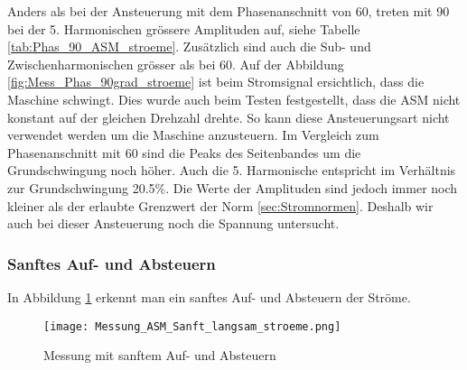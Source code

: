 Anders als bei der Ansteuerung mit dem Phasenanschnitt von 60\textdegree, treten mit 90\textdegree \hspace{0.02cm} bei der 5. Harmonischen grössere Amplituden auf, siehe Tabelle \ref{tab:Phas_90_ASM_stroeme}. Zusätzlich sind auch die Sub- und Zwischenharmonischen grösser als bei 60\textdegree. Auf der Abbildung \ref{fig:Mess_Phas_90grad_stroeme} ist beim Stromsignal ersichtlich, dass die Maschine schwingt. Dies wurde auch beim Testen festgestellt, dass die ASM nicht konstant auf der gleichen Drehzahl drehte. So kann diese Ansteuerungsart nicht verwendet werden um die Maschine anzusteuern. 
Im Vergleich zum Phasenanschnitt mit 60\textdegree\hspace{0.02cm} sind die Peaks des Seitenbandes um die Grundschwingung noch höher. Auch die 5. Harmonische entspricht im Verhältnis zur Grundschwingung 20.5\%. Die Werte der Amplituden sind jedoch immer noch kleiner als der erlaubte Grenzwert der Norm \ref{sec:Stromnormen}. Deshalb wir auch bei dieser Ansteuerung noch die Spannung untersucht. 



\subsubsection*{Sanftes Auf- und Absteuern}

In Abbildung \ref{fig:Mess_Sanft_langsam_stroeme} erkennt man ein sanftes Auf- und Absteuern der Ströme.

\begin{figure}[ht!]
	\centering
	\texttt{[image: Messung\_ASM\_Sanft\_langsam\_stroeme.png]}	
	\caption{Messung mit sanftem Auf- und Absteuern}\label{fig:Mess_Sanft_langsam_stroeme}
\end{figure}

